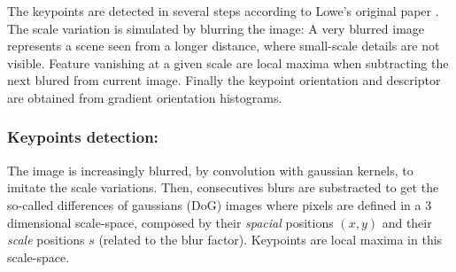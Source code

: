 \documentclass[preprint]{iucr}
\begin{document}


The keypoints are detected in several steps according to Lowe's
original paper \cite{Lowe99}.
The scale variation is simulated by blurring the image:
A very blurred image represents a scene seen from a longer distance, where
small-scale details are not visible. Feature vanishing at a given scale are
local maxima when subtracting the next blured from current image. Finally the
keypoint orientation and descriptor are obtained from gradient orientation
histograms.


\subsubsection{Keypoints detection:}

The image is increasingly blurred, by convolution with gaussian kernels, to
imitate the scale variations.
Then, consecutives blurs are substracted to get the so-called differences of
gaussians (DoG) images where pixels are defined in a 3 dimensional
scale-space, composed by  their \emph{spacial} positions $(x,y)$ and their
\emph{scale} positions $s$ (related to the blur factor). Keypoints are
local maxima in this scale-space.
\end{document}
